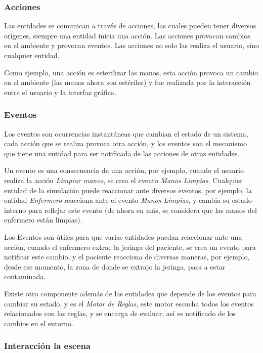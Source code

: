 \subsubsection{Acciones}

Las entidades se comunican a través de acciones, las cuales pueden tener
diversos orígenes, siempre una entidad inicia una acción. Las acciones provocan
cambios en el ambiente y provocan eventos. Las acciones no solo las
realiza el usuario, sino cualquier entidad.

Como ejemplo, una acción es esterilizar las manos, esta acción provoca un
cambio en el ambiente (las manos ahora son estériles) y fue realizada por la
interacción entre el usuario y la interfaz gráfica.

\subsubsection{Eventos}

Los eventos son ocurrencias instantáneas que cambian el estado de un
sistema\cite{banks2000dm}, cada acción que se realiza provoca otra acción, y los
eventos son el mecanismo que tiene una entidad para ser notificada de las
acciones de otras entidades.

Un evento es una consecuencia de una acción, por ejemplo, cuando el usuario 
realiza la acción \emph{Limpiar manos}, se crea el evento \emph{Manos Limpias}. 
Cualquier entidad de la simulación puede reaccionar ante diversos eventos, 
por ejemplo, la entidad \emph{Enfermero} reacciona ante el evento \emph{Manos
Limpias}, y cambia su estado interno para reflejar este evento (de ahora en 
más, se considera que las manos del enfermero están limpias).

Los Eventos son útiles para que varias entidades puedan reaccionar ante
una acción, cuando el enfermero extrae la jeringa del paciente, se crea un
evento para notificar este cambio, y el paciente reacciona de diversas maneras,
por ejemplo, desde ese momento, la zona de donde se extrajo la jeringa, pasa a 
estar contaminada. 

Existe otro componente además de las entidades que depende de los eventos 
para cambiar su estado, y es el \emph{Motor de Reglas}, este motor escucha
todos los eventos relacionados con las reglas, y se encarga de evaluar, así
es notificado de los cambios en el entorno.

\subsubsection{Interacción la escena}

